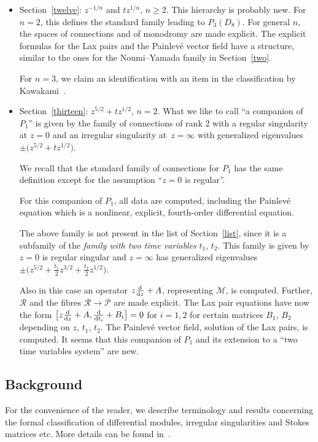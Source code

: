 \documentclass[pdftex]{sigma}
\numberwithin{equation}{section}
\begin{document}
\begin{itemize}
\item Section~\ref{twelve}: $z^{-1/n}$ and $tz^{1/n}$, $n\geq 2$. This hierarchy is probably new. For $n=2$, this defines the standard family leading to $P_3(D_8)$. For general $n$, the spaces of connections and of monodromy
 are made explicit. The explicit formulas for the Lax pairs and the Painlev\'e vector field have a structure,
similar to the ones for the Noumi--Yamada family in Section~\ref{two}.

 For $n=3$, we claim an identification with an item in the classification
 by Kawakami~\cite[p.~35]{K3}.

\item Section~\ref{thirteen}: $z^{5/2}+tz^{1/2}$, $n=2$.
What we like to call ``a companion of $P_1$'' is given by the family of connections of rank 2 with a regular singularity
at $z=0$ and an irregular singularity at~${z=\infty}$ with generalized eigenvalues $\pm \bigl(z^{5/2}+tz^{1/2}\bigr)$.

We recall that the standard family of connections for $P_1$ has the same definition except for the assumption
``$z=0$ is regular''.

 For this companion of $P_1$, all data are computed, including the Painlev\'e equation which is a nonlinear, explicit,
 fourth-order differential equation.

 The above family is not present in the list of Section~\ref{list}, since it is a subfamily of the {\it family
 with two time variables } $t_1$, $t_2$. This family is given by $z=0$ is regular singular and $z=\infty$ has generalized eigenvalues $\pm \bigl( z^{5/2}+\frac{t_1}{2}z^{3/2}+\frac{t_2}{2}z^{1/2} \bigr)$.

 Also in this case an operator $z\frac{{\rm d}}{{\rm d}z}+A$, representing $\mathcal{M}$, is computed. Further, $\mathcal{R}$ and the fibres $\mathcal{R}\rightarrow \mathcal{P}$ are made explicit. The Lax pair equations have now the form $\bigl[\smash{z\frac{{\rm d}}{{\rm d}z}+A, \frac{{\rm d}}{{\rm d}t_i}}+B_i\bigr]=0$ for $i=1,2$ for certain matrices $B_1$, $B_2$ depending on $z$, $t_1$, $t_2$. The Painlev\'e vector field, solution of the Lax pairs, is computed.
 It seems that this companion of $P_1$ and its extension to a ``two time variables system'' are new.
 \end{itemize}

\subsection{Background}
For the convenience of the reader, we describe terminology and results concerning the
formal classification of differential modules, irregular singularities and Stokes matrices etc.
More details can be found in~\cite{vdP-Si}.
\end{document}
